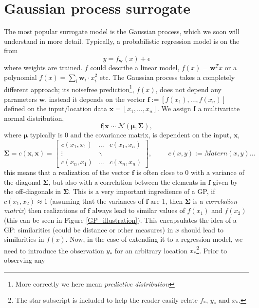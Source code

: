 \section{Gaussian process surrogate}

The most popular surrogate model is the Gaussian process, which we soon will understand
in more detail. Typically, a probabilistic regression model is on the from 
$$y = f_{\textbf{w}}(x) + \epsilon$$
where weights are trained. $f$ could describe a linear model, $f(x) = \textbf{w}^Tx$ or a polynomial
$f(x) = \sum_i\textbf{w}_i\cdot x_i^2$ etc. %
The Gaussian process takes a completely different approach; its noisefree prediction\footnote{More
correctly we here mean \textit{predictive distribution}}, $f(x)$, does not depend any parameters
$\textbf{w}$, instead it depends on the vector $\textbf{f} := [f(x_1),\dots,f(x_n)]$ defined on the
input/location data $\textbf{x} = [x_1, \dots, x_n]$. We assign \textbf{f} a multivariate normal distribution, 
$$\textbf{f}|\textbf{x} \sim \mathcal{N}(\bm{\mu}, \bm{\Sigma}),$$
where $\bm{\mu}$ typically is $0$ and the covariance matrix, is dependent on the input, $\textbf{x}$, 
 $$\bm{\Sigma} = c(\textbf{x}, \textbf{x}) = \begin{bmatrix}
    c(x_1,x_1) & \dots & c(x_1,x_n)\\
    \vdots& \ddots\\
    c(x_n,x_1) & \dots & c(x_n,x_n) \end{bmatrix},\hspace{1cm} c(x, y) := Matern(x,y)...$$ this
    means that a realization of the vector $\textbf{f}$ is often close to 0 with a variance of the
    diagonal $\bm{\Sigma}$, but also with a correlation between the elements in $\textbf{f}$ given
    by the off-diagonals in $\bm{\Sigma}$. This is a very important ingredience of a GP, if
    $c(x_1,x_2) \approx 1$ (assuming that the variances of $\textbf{f}$ are 1, then $\bm{\Sigma}$ is
    a \textit{correlation matrix}) then realizations of $\textbf{f}$ always lead to similar values
    of $f(x_1)$ and $f(x_2)$ (this can be seen in Figure \ref{GP_illustration}). This encapsulates
    the idea of a GP: similarities (could be distance or other measures) in $x$ should lead to
    similarities in $f(x)$. Now, in the case of extending it to a regression model, we need to
    introduce the observation $y_*$ for an arbitrary location $x_*$\footnote{The star subscript is
    included to help the reader easily relate $f_*$, $y_*$ and $x_*$.}. Prior to observing any
